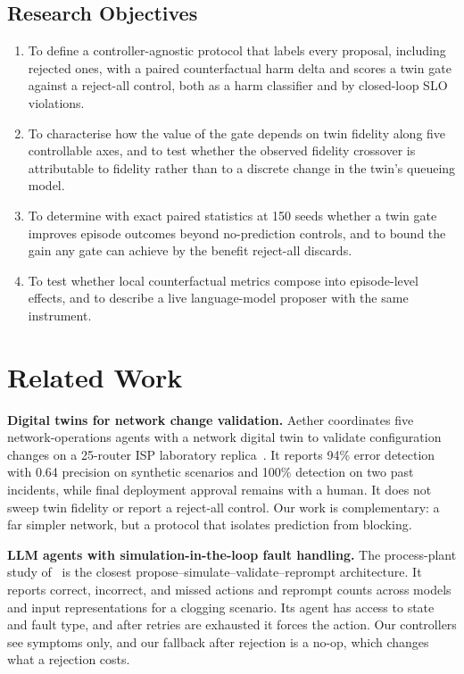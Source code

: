 \documentclass[conference]{IEEEtran}
\begin{document}
\subsection{Research Objectives}

\begin{enumerate}
  \renewcommand{\labelenumi}{\textbf{RO\arabic{enumi}.}}
  \item To define a controller-agnostic protocol that labels every proposal, including rejected ones, with a paired counterfactual harm delta and scores a twin gate against a reject-all control, both as a harm classifier and by closed-loop SLO violations.
  \item To characterise how the value of the gate depends on twin fidelity along five controllable axes, and to test whether the observed fidelity crossover is attributable to fidelity rather than to a discrete change in the twin's queueing model.
  \item To determine with exact paired statistics at 150 seeds whether a twin gate improves episode outcomes beyond no-prediction controls, and to bound the gain any gate can achieve by the benefit reject-all discards.
  \item To test whether local counterfactual metrics compose into episode-level effects, and to describe a live language-model proposer with the same instrument.
\end{enumerate}

\section{Related Work}

\textbf{Digital twins for network change validation.} Aether coordinates five network-operations agents with a network digital twin to validate configuration changes on a 25-router ISP laboratory replica~\cite{aether}. It reports 94\% error detection with 0.64 precision on synthetic scenarios and 100\% detection on two past incidents, while final deployment approval remains with a human. It does not sweep twin fidelity or report a reject-all control. Our work is complementary: a far simpler network, but a protocol that isolates prediction from blocking.

\textbf{LLM agents with simulation-in-the-loop fault handling.} The process-plant study of~\cite{processplant} is the closest propose--simulate--validate--reprompt architecture. It reports correct, incorrect, and missed actions and reprompt counts across models and input representations for a clogging scenario. Its agent has access to state and fault type, and after retries are exhausted it forces the action. Our controllers see symptoms only, and our fallback after rejection is a no-op, which changes what a rejection costs.
\end{document}
